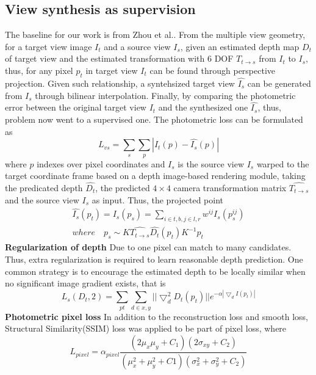 \documentclass[10pt,twocolumn,letterpaper]{article}
\begin{document}
\subsection{View synthesis as supervision}
The baseline for our work is from Zhou et al.\cite{zhou2017unsupervised}. From the multiple view geometry, for a target view  image $I_t$ and a source view $I_s$, given an estimated depth map $D_t$ of target view and the estimated transformation with 6 DOF $T_{t\xrightarrow{}s}$ from $I_t$ to $I_s$, thus, for any pixel $p_t$ in target view $I_t$ can be found through perspective projection. Given such relationship, a syntehsized target view $\hat{I_s}$ can be generated from $I_s$ through bilinear interpolation. Finally, by comparing the photometric error between the original target view $I_t$ and the synthesized one $\hat{I_s}$, thus, problem now went to a supervised one. The photometric loss can be formulated as 
\begin{equation}
    L_{vs} = \sum_s\sum_p |I_t(p) - \hat{I_s}(p)|
\end{equation}
where $p$ indexes over pixel coordinates and $I_s$ is the source view $I_s$ warped to the target coordinate frame based on a depth image-based rendering module, taking the predicated depth $\hat{D_t}$, the predicted $4 \times 4$ camera transformation matrix $\hat{T_{t\xrightarrow{}s}}$ and the source view $I_s$ as input. Thus, the projected point
\begin{multline}
        \hat{I_s}(p_t) = I_s(p_s)=\sum_{i\in{t,b}, j\in{l,r}} w^{ij}I_s(p_s^{ij})
    \\
    where\quad p_s \sim K\hat{T_{t\xrightarrow{}s}}\hat{D_t}(p_t)K^{-1}p_t
\end{multline}
\textbf{Regularization of depth} Due to one pixel can match to many candidates. Thus, extra regularization is required to learn reasonable depth prediction. One common strategy is to encourage the estimated depth to be locally similar when no significant image gradient exists, that is 
\begin{equation}
    L_s(D_t, 2) = \sum_{pt}\sum_{d\in x, y}||\bigtriangledown_d^2D_t(p_t)||e^{-\alpha|\bigtriangledown_dI(p_t)|}
\end{equation}
\textbf{Photometric pixel loss} In addition to the reconstruction loss and smooth loss, Structural Similarity(SSIM)\cite{wang2004image} loss was applied to be part of pixel loss, where
\begin{equation}
    L_{pixel} = \alpha_{pixel} \frac{(2\mu_x\mu_y + C_1)(2\sigma_{xy} + C_2)}{(\mu_x^2 + \mu_y^2 + C1)(\sigma_x^2 + \sigma_y^2 + C_2)}
\end{equation}
\end{document}
